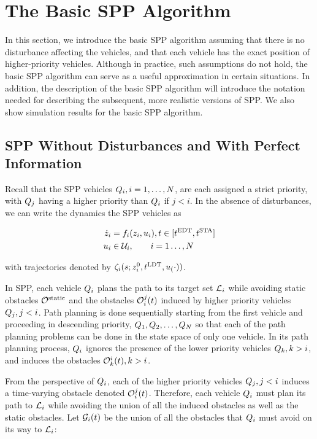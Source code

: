 \section{The Basic SPP Algorithm\label{sec:basic}}
In this section, we introduce the basic SPP algorithm assuming that there is no disturbance affecting the vehicles, and that each vehicle has the exact position of higher-priority vehicles. Although in practice, such assumptions do not hold, the basic SPP algorithm can serve as a useful approximation in certain situations. In addition, the description of the basic SPP algorithm will introduce the notation needed for describing the subsequent, more realistic versions of SPP. We also show simulation results for the basic SPP algorithm.

\subsection{SPP Without Disturbances and With Perfect Information}
Recall that the SPP vehicles $Q_{i}, i=1,\ldots,N$, are each assigned a strict priority, with $Q_{j}$ having a higher priority than $Q_{i}$ if $j<i$. In the absence of disturbances, we can write the dynamics the SPP vehicles as

\begin{equation}
\label{eq:basic_dyn}
\begin{aligned}
\dot\state_i &= \fdyn_i(\state_i, \ctrl_i), t \in [\edt, \sta] \\
\ctrl_i &\in \cset_i, \qquad i = 1 \ldots, \N
\end{aligned}
\end{equation}

\noindent with trajectories denoted by $\zeta_i(s; z^0_i, t^\text{LDT}, u_(\cdot))$.

In SPP, each vehicle $Q_{i}$ plans the path to its target set $\mathcal{L}_i$ while avoiding static obstacles $\mathcal{O}^\text{static}$ and the obstacles $\mathcal{O}_i^j(t)$ induced by higher priority vehicles $Q_{j}, j<i$. Path planning is done sequentially starting from the first vehicle and proceeding in descending priority, $Q_{1}, Q_{2}, \ldots, Q_{N}$ so that each of the path planning problems can be done in the state space of only one vehicle. In its path planning process, $Q_{i}$ ignores the presence of the lower priority vehicles $Q_{k}, k>i$, and induces the obstacles $\mathcal{O}_k^i(t), k>i$.

From the perspective of $Q_{i}$, each of the higher priority vehicles $Q_{j}, j<i$ induces a time-varying obstacle denoted $\mathcal{O}_i^j(t)$. Therefore, each vehicle $Q_{i}$ must plan its path to $\mathcal{L}_i$ while avoiding the union of all the induced obstacles as well as the static obstacles. Let $\mathcal{G}_i(t)$ be the union of all the obstacles that $Q_{i}$ must avoid on its way to $\mathcal{L}_i$:

